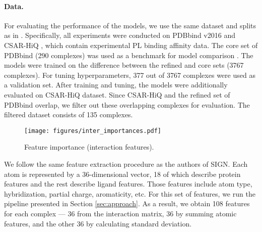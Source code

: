 \documentclass[nohyperref]{article}
\theoremstyle{plain}
\theoremstyle{definition}
\theoremstyle{remark}
\begin{document}
\paragraph{Data.}
For evaluating the performance of the models, we use the same dataset and splits as in \cite{sign}. Specifically, all experiments were conducted on PDBbind v2016 \cite{pdbbind} and CSAR-HiQ \cite{csar}, which contain experimental PL binding affinity data. The core set of PDBbind (290 complexes) was used as a benchmark for model comparison \cite{core}. The models were trained on the difference between the refined and core sets (3767 complexes). For tuning hyperparameters, 377 out of 3767 complexes were used as a validation set. After training and tuning, the models were additionally evaluated on CSAR-HiQ dataset. Since CSAR-HiQ and the refined set of PDBbind overlap, we filter out these overlapping complexes for evaluation. The filtered dataset consists of 135 complexes.

\begin{figure}[t]
\vskip 0.2in
\begin{center}
\centerline{\texttt{[image: figures/inter\_importances.pdf]}}
\caption{Feature importance (interaction features).}
\label{fig:inter_importances}
\end{center}
\vskip -0.2in
\end{figure}

We follow the same feature extraction procedure as the authors of SIGN. Each atom is represented by a 36-dimensional vector, 18 of which describe protein features and the rest describe ligand features. Those features include atom type, hybridization, partial charge, aromaticity, etc. For this set of features, we run the pipeline presented in Section \ref{sec:approach}. As a result, we obtain 108 features for each complex — 36 from the interaction matrix, 36 by summing atomic features, and the other 36 by calculating standard deviation.
\end{document}
